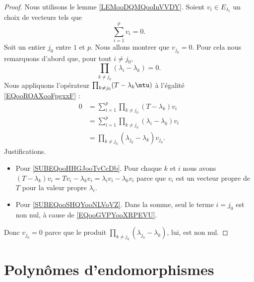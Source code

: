 \begin{proof}
	Nous utilisons le lemme \ref{LEMooDQMQooInVVDY}. Soient \( v_i\in E_{\lambda_i}\) un choix de vecteurs tels que
	\begin{equation}        \label{EQooROAXooFpgxxF}
		\sum_{i=1}^pv_i=0.
	\end{equation}
	Soit un entier \( j_0\) entre \( 1\) et \( p\). Nous allons montrer que \( v_{j_0}=0\). Pour cela nous remarquons d'abord que, pour tout \( i\neq j_0\),
	\begin{equation}        \label{EQooGVPYooXRPEVU}
		\prod_{k\neq j_0}(\lambda_i-\lambda_k)=0.
	\end{equation}
	Nous appliquons l'opérateur \( \prod_{k\neq j_0}(T-\lambda_k\mtu)\) à l'égalité \eqref{EQooROAXooFpgxxF} :
	\begin{subequations}
		\begin{align}
			0 & = \sum_{i=1}^p\prod_{k\neq j_0}(T-\lambda_k)v_i                                                   \\
			  & = \sum_{i=1}^p\prod_{k\neq j_0}(\lambda_i-\lambda_k)v_i       \label{SUBEQooHHGJooTvCcDb}         \\
			  & = \prod_{k\neq j_0}(\lambda_{j_0}-\lambda_k)v_{j_0}.                  \label{SUBEQooSHQYooNLVoVZ}
		\end{align}
	\end{subequations}
	Justifications.
	\begin{itemize}
		\item Pour \eqref{SUBEQooHHGJooTvCcDb}. Pour chaque \( k\) et \( i\) nous avons \( (T-\lambda_k)v_i=Tv_i-\lambda_kv_i=\lambda_iv_i-\lambda_kv_i\) parce que \( v_i\) est un vecteur propre de \( T\) pour la valeur propre \( \lambda_i\).
		\item Pour \eqref{SUBEQooSHQYooNLVoVZ}. Dans la somme, seul le terme \( i=j_0\) est non nul, à cause de \eqref{EQooGVPYooXRPEVU}.
	\end{itemize}
	Donc \( v_{j_0}=0\) parce que le produit \( \prod_{k\neq j_0}(\lambda_{j_0}-\lambda_k)\), lui, est non nul.
\end{proof}



\section{Polynômes d'endomorphismes}
\label{SECooUEQVooLBrRiE}

